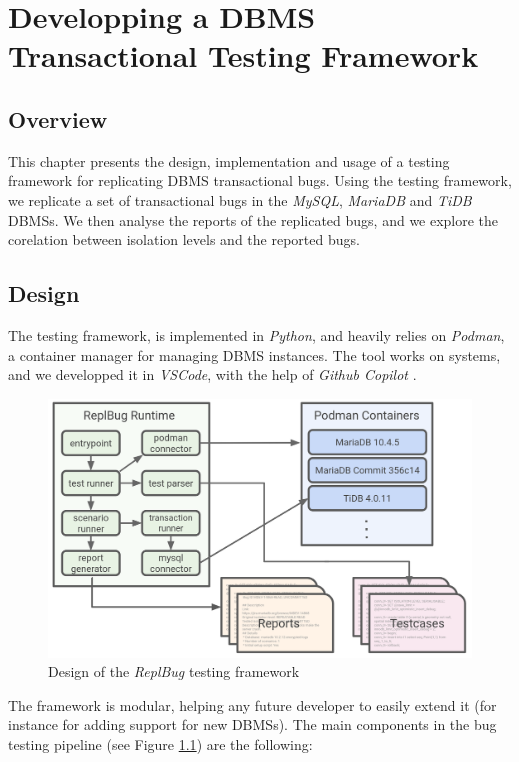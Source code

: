 \chapter{Developping a DBMS Transactional Testing Framework}

\section{Overview}

This chapter presents the design, implementation and usage of a testing framework for replicating DBMS transactional bugs. Using the testing framework, we replicate a set of transactional bugs in the \textit{MySQL}, \textit{MariaDB} and \textit{TiDB} DBMSs. We then analyse the reports of the replicated bugs, and we explore the corelation between isolation levels and the reported bugs.

\section{Design}

The testing framework, is implemented in \textit{Python}, and heavily relies on \textit{Podman}, a container manager \cite{podmanwebpage} for managing DBMS instances. The tool works on  systems, and we developped it in \textit{VSCode}, with the help of \textit{Github Copilot} \cite{copilotwebpage}.


\begin{figure}[!h]
    \centering
    \includegraphics[width=\linewidth]{assets/replbug_design.png}
    \caption{Design of the \textit{ReplBug} testing framework}
    \label{fig:replb_design}
\end{figure}


The framework is modular, helping any future developer to easily extend it (for instance for adding support for new DBMSs). The main components in the bug testing pipeline (see Figure \ref{fig:replb_design}) are the following:

